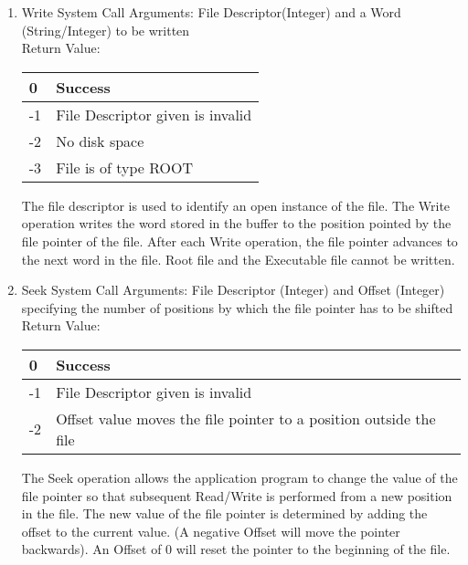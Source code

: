 \begin{enumerate}
\item{Write System Call}
Arguments: File Descriptor(Integer) and a Word (String/Integer) to be written\\
Return Value:
\FloatBarrier \begin{table}[H]
\centering
\begin{tabular}{|l|l|}
\hline
0  & Success           \\ \hline
-1 & File Descriptor given is invalid  \\ \hline
-2 & No disk space \\ \hline
-3 & File is of type ROOT \\ \hline
\end{tabular}
\end{table} \FloatBarrier 

The file descriptor is used to identify an open instance of the file. The Write operation writes the word stored in the buffer to the position pointed by the file pointer of the file. After each Write operation, the file pointer advances to the next word in the file. Root file and the Executable file cannot be written.

\item{Seek System Call}
Arguments: File Descriptor (Integer) and Offset (Integer) specifying the number of positions by which the file pointer has to be shifted\\
Return Value:
\FloatBarrier \begin{table}[H]
\centering
\begin{tabular}{|l|l|}
\hline
0  & Success           \\ \hline
-1 & File Descriptor given is invalid  \\ \hline
-2 & Offset value moves the file pointer to a position outside the file \\ \hline
\end{tabular}
\end{table} \FloatBarrier 

The Seek operation allows the application program to change the value of the file pointer so that subsequent Read/Write is performed from a new position in the file. The new value of the file pointer is determined by adding the offset to the current value. (A negative Offset will move the pointer backwards). An Offset of 0 will reset the pointer to the beginning of the file. 
\end{enumerate}


